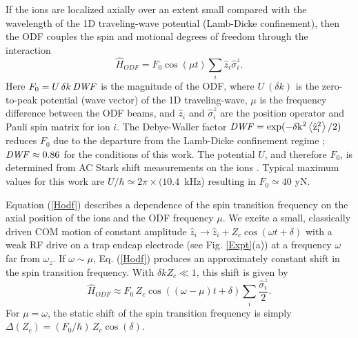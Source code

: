 \documentclass[aps,prl,twocolumn,superscriptaddress,floatfix]{revtex4-1}
\begin{document}
If the ions are localized axially over an extent small compared with the wavelength of the 1D traveling-wave potential (Lamb-Dicke confinement), then the ODF couples the spin and motional degrees of freedom through the interaction \citep{Bohnet2015}
\begin{equation}
\hat{H}_{ODF} = F_0\cos\left(\mu t \right)\sum_{i} \hat{z}_{i} \hat{\sigma}^{z}_{i}.
\label{Hodf}
\end{equation}
Here $F_{0}= U \, \delta k \, \rm{\it{DWF}}$ is the magnitude of the ODF, where $U\:(\delta k)$ is the zero-to-peak potential (wave vector) of the 1D traveling-wave, $\mu$ is the frequency difference between the ODF beams, and $\hat{z}_{i}$ and $\hat{\sigma}^{z}_{i}$ are the position operator and Pauli spin matrix for ion $i$. The Debye-Waller factor $\rm{\it{DWF}} = \exp(-\delta k^2 \left< \hat{z}^{2}_{i} \right> / 2)$ reduces $F_{0}$ due to the departure from the Lamb-Dicke confinement regime \citep{Wineland1998a}; $\rm{\it{DWF}} \approx 0.86 $ for the conditions of this work. The potential $U$, and therefore $F_0$, is determined from AC Stark shift measurements on the ions \citep{Britton2012}. Typical maximum values for this work are $U/\hbar \simeq 2 \pi \times (10.4$~kHz) resulting in $F_0 \simeq 40$ yN.

Equation (\ref{Hodf}) describes a dependence of the spin transition frequency on the axial position of the ions and the ODF frequency $\mu$. We excite a small, classically driven COM motion of constant amplitude $\hat{z}_i \rightarrow \hat{z}_i +Z_c\cos(\omega t+\delta)$ with a weak RF drive on a trap endcap electrode (see Fig. \ref{Expt}(a)) at a frequency $\omega$ far from $\omega_{z}$. If $\omega\sim\mu$, Eq. (\ref{Hodf}) produces an approximately constant shift in the spin transition frequency. With $\delta k Z_c \ll 1$, this shift is given by
\begin{equation}
\hat{H}_{ODF} \approx F_{0} \, Z_c\cos((\omega - \mu)t + \delta) \sum_{i} \frac{\hat{\sigma}^{z}_{i}}{2} .
\end{equation}
For $\mu = \omega$, the static shift of the spin transition frequency is simply $\Delta(Z_c) = (F_{0}/\hbar) \, Z_c \cos(\delta)$.
\end{document}
